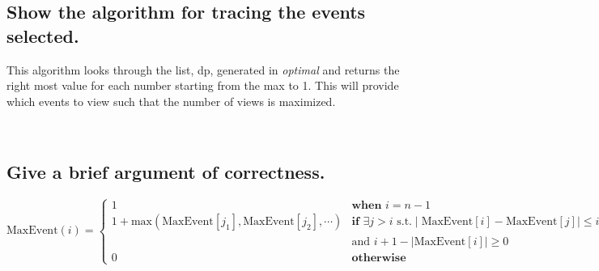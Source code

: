 \documentclass[11pt]{scrartcl}
\begin{document}
\subsection{
	Show the algorithm for tracing the events selected.
}
This algorithm looks through the list, dp, generated in \textit{optimal} and returns the
right most value for each number starting from the max to 1. This will provide which 
events to view such that the number of views is maximized.
\begin{algorithm}
\end{algorithm}\-\\



\subsection{
	Give a brief argument of correctness.
}

\[
	\text{MaxEvent}(i)=
	\begin{cases}
		1 & \textbf{when } i = n - 1                                                                           \\
		1 + \text{max}(\text{MaxEvent}[j_1], \text{MaxEvent}[j_2], \cdots )
		  & \textbf{if } \exists j > i \text{ s.t.} \mid \text{MaxEvent}[i]-\text{MaxEvent}[j] \mid \leq i - j \\
		  & \text{and } i + 1 - \mid \text{MaxEvent}[i] \mid  \geq 0                                           \\
		0 & \textbf{otherwise}
	\end{cases}
\]
\end{document}
